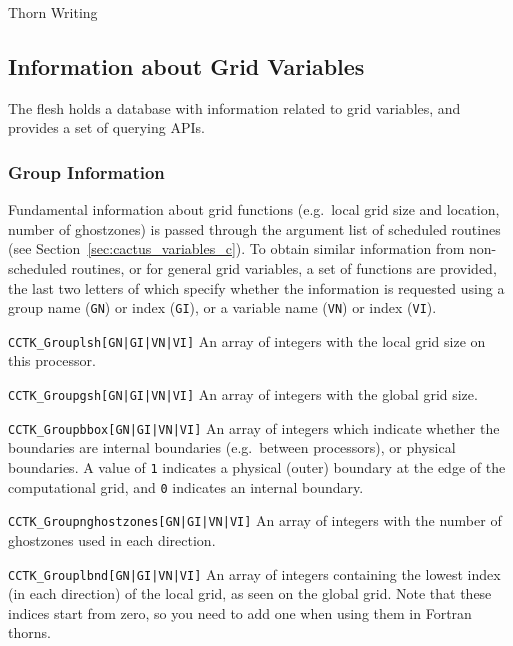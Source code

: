 \begin{cactuspart}{Thorn Writing}

\subsection{Information about Grid Variables}

The flesh holds a database with information related to grid variables, and
provides a set of querying APIs.

\subsubsection{Group Information}

Fundamental information about grid functions (e.g.\ local grid size and
location, number of ghostzones) is passed through the argument list of
scheduled routines (see Section~\ref{sec:cactus_variables_c}). To obtain similar information
from non-scheduled routines, or for general grid variables, a set of
functions are provided, the last two letters of which specify whether
the information is requested using a group name (\texttt{GN}) or index
(\texttt{GI}), or a variable name (\texttt{VN}) or index (\texttt{VI}).

\begin{Lentry}

\item [\texttt{CCTK\_Grouplsh[GN|GI|VN|VI]}]    An array of integers
      with the local grid size on this processor.

\item [\texttt{CCTK\_Groupgsh[GN|GI|VN|VI]}]    An array of integers
      with the global grid size.

\item [\texttt{CCTK\_Groupbbox[GN|GI|VN|VI]}]      An array of  integers
      which indicate whether the boundaries are internal boundaries
      (e.g.\ between processors), or physical boundaries.
        A value of \texttt{1} indicates
      a physical (outer) boundary at the edge of the computational grid,
      and \texttt{0} indicates an internal boundary.

\item [\texttt{CCTK\_Groupnghostzones[GN|GI|VN|VI]}]    An array of integers with
         the number of ghostzones used in each direction.

\item [\texttt{CCTK\_Grouplbnd[GN|GI|VN|VI]}]       An array of integers
      containing the lowest index (in each direction)
      of the local grid, as seen on the global grid. Note that these indices
      start from zero, so you need to add one when using them in
      Fortran thorns.


\end{Lentry}
\end{cactuspart}
